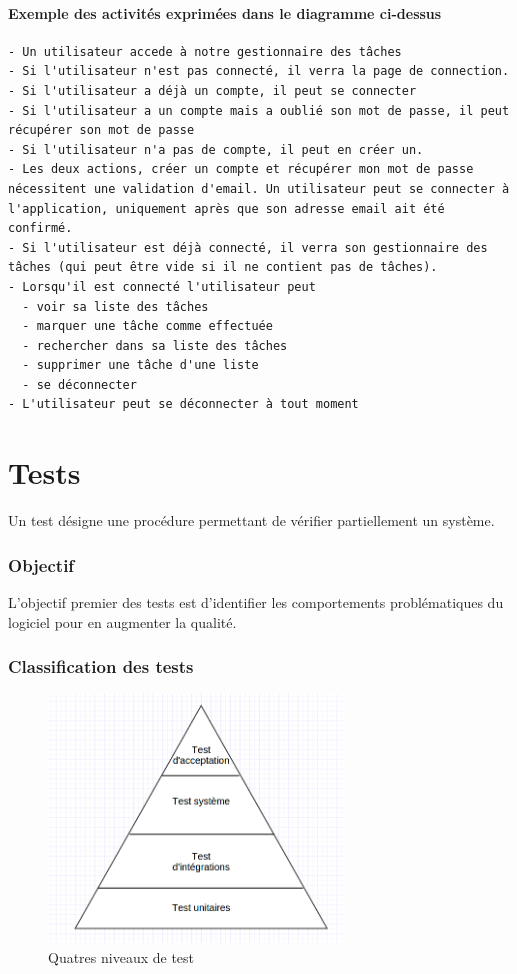 \paragraph{Exemple des activités exprimées dans le diagramme ci-dessus}
\begin{verbatim}
- Un utilisateur accede à notre gestionnaire des tâches 
- Si l'utilisateur n'est pas connecté, il verra la page de connection.
- Si l'utilisateur a déjà un compte, il peut se connecter
- Si l'utilisateur a un compte mais a oublié son mot de passe, il peut récupérer son mot de passe
- Si l'utilisateur n'a pas de compte, il peut en créer un. 
- Les deux actions, créer un compte et récupérer mon mot de passe nécessitent une validation d'email. Un utilisateur peut se connecter à l'application, uniquement après que son adresse email ait été confirmé. 
- Si l'utilisateur est déjà connecté, il verra son gestionnaire des tâches (qui peut être vide si il ne contient pas de tâches). 
- Lorsqu'il est connecté l'utilisateur peut 
  - voir sa liste des tâches
  - marquer une tâche comme effectuée
  - rechercher dans sa liste des tâches
  - supprimer une tâche d'une liste
  - se déconnecter
- L'utilisateur peut se déconnecter à tout moment 
\end{verbatim}



\section{Tests}
Un test désigne une procédure permettant de vérifier partiellement un système. 

\subsubsection{Objectif}
L'objectif premier des tests est d'identifier les comportements problématiques du logiciel pour en augmenter la qualité. 

\subsubsection{Classification des tests}

\begin{figure}[h!]
\centering
\includegraphics[width=0.7\textwidth]{assets/pyramide_tests.png}
\caption{Quatres niveaux de test}
\label{fig:my_label}
\end{figure}

